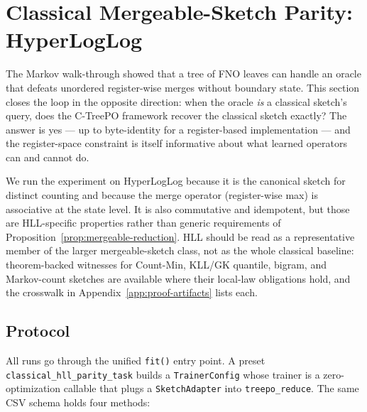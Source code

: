 \section{Classical Mergeable-Sketch Parity: HyperLogLog}\label{sec:hll-parity}

The Markov walk-through showed that a tree of FNO leaves can handle an
oracle that defeats unordered register-wise merges without boundary
state. This section closes the loop in the opposite direction: when the oracle \emph{is} a
classical sketch's query, does the C-TreePO framework recover the
classical sketch exactly? The answer is yes --- up to byte-identity for
a register-based implementation --- and the register-space constraint is
itself informative about what learned operators can and cannot do.

We run the experiment on HyperLogLog \citep{FlajoletEtAl2007,HeuleEtAl2013}
because it is the canonical sketch for distinct counting and because the
merge operator (register-wise max) is associative at the state level. It is
also commutative and idempotent, but those are HLL-specific properties rather
than generic requirements of Proposition~\ref{prop:mergeable-reduction}.
HLL should be read as a representative member of the larger mergeable-sketch
class, not as the whole classical baseline: theorem-backed witnesses for
Count-Min, KLL/GK quantile, bigram, and Markov-count sketches are available
where their local-law obligations hold, and the crosswalk in
Appendix~\ref{app:proof-artifacts} lists each.

\subsection{Protocol}

All runs go through the unified \texttt{fit()} entry point. A preset
\texttt{classical\_hll\_parity\_task} builds a \texttt{TrainerConfig} whose
trainer is a zero-optimization callable that plugs a \texttt{SketchAdapter}
into \texttt{treepo\_reduce}. The same CSV schema holds four methods:

